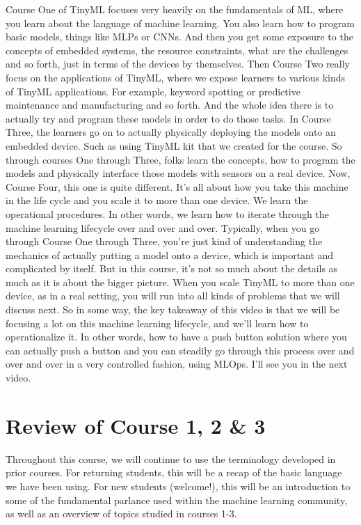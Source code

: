 Course One of TinyML focuses very heavily on the fundamentals of ML,
where you learn about the language of machine learning.
You also learn how to program basic models, things like MLPs or CNNs.
And then you get some exposure to the concepts
of embedded systems, the resource constraints,
what are the challenges and so forth, just in terms of the devices
by themselves.
Then Course Two really focus on the applications of TinyML,
where we expose learners to various kinds of TinyML applications.
For example, keyword spotting or predictive maintenance
and manufacturing and so forth.
And the whole idea there is to actually try and program these models
in order to do those tasks.
In Course Three, the learners go on to actually physically deploying
the models onto an embedded device.
Such as using TinyML kit that we created for the course.
So through courses One through Three, folks learn the concepts,
how to program the models and physically interface those models
with sensors on a real device.
Now, Course Four, this one is quite different.
It's all about how you take this machine in the life cycle
and you scale it to more than one device.
We learn the operational procedures.
In other words, we learn how to iterate through the machine learning
lifecycle over and over and over.
Typically, when you go through Course One through Three,
you're just kind of understanding the mechanics of actually putting
a model onto a device, which is important and complicated by itself.
But in this course, it's not so much about the details
as much as it is about the bigger picture.
When you scale TinyML to more than one device, as in a real setting,
you will run into all kinds of problems that we will discuss next.
So in some way, the key takeaway of this video
is that we will be focusing a lot on this machine learning lifecycle,
and we'll learn how to operationalize it.
In other words, how to have a push button solution where you can actually
push a button and you can steadily go through this process over and over
and over in a very controlled fashion, using MLOps.
I'll see you in the next video.

\section{Review of Course 1, 2 \& 3}

Throughout this course, we will continue to use the terminology developed in prior courses. For returning students, this will be a recap of the basic language we have been using. For new students (welcome!), this will be an introduction to some of the fundamental parlance used within the machine learning community, as well as an overview of topics studied in courses 1-3.

